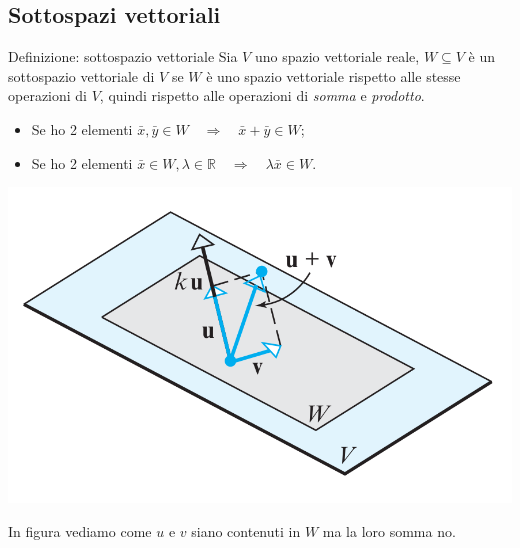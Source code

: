 \documentclass[x11names]{article}
\begin{document}
\subsection{Sottospazi vettoriali}
\begin{center}
\colorbox{myblue}{\begin{minipage}{5.75in}
\begin{blues}{Definizione: sottospazio vettoriale}
Sia $V$ uno spazio vettoriale reale, $W \subseteq V $ è un sottospazio vettoriale di $V$ se $W$ è uno spazio vettoriale rispetto alle stesse operazioni di $V$, quindi rispetto alle operazioni di \textit{somma} e \textit{prodotto}.

\begin{itemize}
	\item Se ho 2 elementi $\bar{x},\bar{y}\in W \quad \Rightarrow \quad \bar{x} + \bar{y} \in W$;
	\item Se ho 2 elementi $\bar{x} \in W, \lambda \in \mathbb{R} \quad \Rightarrow \quad \lambda\bar{x} \in W$.
\end{itemize}

\end{blues}
\end{minipage}}        
\end{center}

\begin{center}
\includegraphics[scale=0.25]{figures/subspace.png}
\end{center}
In figura vediamo come $u$ e $v$ siano contenuti in $W$ ma la loro somma no.
\end{document}
